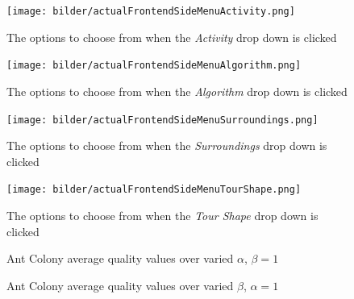\begin{figure}[H]
	\centering
	\texttt{[image: bilder/actualFrontendSideMenuActivity.png]}
	\caption{The options to choose from when the \textit{Activity} drop down is clicked}
	\label{fig:actualFrontendSideMenuActivity}
\end{figure}



\begin{figure}[H]
	\centering
	\texttt{[image: bilder/actualFrontendSideMenuAlgorithm.png]}
	\caption{The options to choose from when the \textit{Algorithm} drop down is clicked}
	\label{fig:actualFrontendSideMenuAlgorithm}
\end{figure}


\begin{figure}[H]
	\centering
	\texttt{[image: bilder/actualFrontendSideMenuSurroundings.png]}
	\caption{The options to choose from when the \textit{Surroundings} drop down is clicked}
	\label{fig:actualFrontendSideMenuSurroundings}
\end{figure}


\begin{figure}[H]
	\centering
	\texttt{[image: bilder/actualFrontendSideMenuTourShape.png]}
	\caption{The options to choose from when the \textit{Tour Shape} drop down is clicked}
	\label{fig:actualFrontendSideMenuTourShape}
\end{figure}








\begin{figure}[H]
	\centering
	
	\caption{Ant Colony average quality values over varied $\alpha$, $\beta = 1$}
	\label{fig:antColonyCasesAlphaVariedAvg}
\end{figure}


\begin{figure}[H]
	\centering
	
	\caption{Ant Colony average quality values over varied $\beta$, $\alpha = 1$}
	\label{fig:antColonyCasesBetaVariedAvg}
\end{figure}








